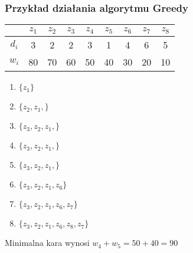 \subsubsection{Przykład działania algorytmu Greedy}
\begin{center}
\begin{tabular}{ c | c | c | c | c | c | c | c | c } 
  	 	& $z_1$	& $z_2$ & $z_3$ & $z_4$	& $z_5$	& $z_6$ & $z_7$ & $z_8$	\\ \hline
  $d_i$	& 3		& 2		& 2		& 3		& 1		& 4		& 6		& 5		\\ \hline
  $w_i$	& 80	& 70	& 60	& 50	& 40	& 30	& 20	& 10	\\ 
\end{tabular}
\end{center}
\begin{enumerate}
	\item $\{ z_1 \}$
	\item $\{ z_2, z_1, \}$
	\item $\{ z_3, z_2, z_1, \}$
	\item $\{ z_3, z_2, z_1, \}$
	\item $\{ z_3, z_2, z_1, \}$
	\item $\{ z_3, z_2, z_1, z_6 \}$
	\item $\{ z_3, z_2, z_1, z_6, z_7 \}$
	\item $\{ z_3, z_2, z_1, z_6, z_8, z_7 \}$
\end{enumerate}

Minimalna kara wynosi $w_4 + w_5 = 50+40 = 90$

